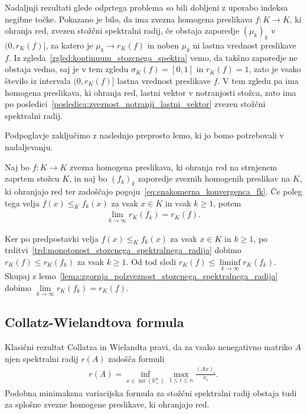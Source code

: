 \documentclass[mat2, tisk]{fmfdelo}
\begin{document}
Nadaljnji rezultati glede odprtega problema so bili dobljeni z uporabo
indeksa negibne točke. Pokazano je bilo, da ima zvezna homogena
preslikava $f\colon K\longrightarrow K$, ki ohranja red, zvezen
stožčni spektralni radij, če obstaja zaporedje $(\mu_k)_k$ v
$(0,r_K(f)]$, za katero je $\mu_k\longrightarrow r_K(f)$ in noben
$\mu_k$ ni lastna vrednost preslikave $f$. Iz zgleda~\ref{zgled:kontinuum_stozcnega_spektra} vemo, da
takšno zaporedje ne obstaja vedno, saj je v tem zgledu $\sigma_K(f)=[0,1]$ in $r_K(f) = 1$, 
zato je vsako število iz intervala $(0,r_K(f)]$ lastna vrednost preslikave $f$. V tem zgledu pa ima homogena
preslikava, ki ohranja red, lastni vektor v notranjosti stožca, zato
ima po posledici~\ref{posledica:zveznost_notranji_lastni_vektor}
zvezen stožčni spektralni radij.

Podpoglavje zaključimo z naslednjo preprosto lemo, ki jo bomo
potrebovali v nadaljevanju.

\begin{lema}\label{lema:zveznost_stozcnega_spektralnega_radija_dominacija}
  Naj bo $f\colon K\longrightarrow K$ zvezna homogena preslikava, ki
  ohranja red na strnjenem zaprtem stožcu $K$, in naj bo $(f_k)_k$
  zaporedje zveznih homogenih preslikav na $K$, ki ohranjajo red ter
  zadoščajo pogoju~\eqref{eq:enakomerna_konvergenca_fk}. Če poleg tega
  velja $f(x)\leq_K f_k(x)$ za vsak $x\in K$ in vsak $k\geq1$, potem
  \begin{align*}
  \lim\limits_{k\to\infty}r_K(f_k)=r_K(f).
  \end{align*}
\end{lema}


\begin{dokaz}
  Ker po predpostavki velja $f(x)\leq_K f_k(x)$ za vsak
  $x\in K$ in $k\geq1$, po
  trditvi~\ref{trd:monotonost_stozcnega_spektralnega_radija}
  dobimo $r_K(f)\leq r_K(f_k)$ za vsak $k\geq1$.
  Od tod sledi
  $r_K(f)\leq\liminf\limits_{k\to\infty}r_K(f_k)$.
  Skupaj z lemo~\ref{lema:zgornja_polzveznost_stozcnega_spektralnega_radija}
  dobimo
  $\lim\limits_{k\to\infty}r_K(f_k)=r_K(f)$.
\end{dokaz}








\subsection{Collatz-Wielandtova formula}

Klasični rezultat Collatza in Wielandta pravi, da za vsako nenegativno
matriko $A$ njen spektralni radij $r(A)$ zadošča formuli
\begin{align}
r(A)
=
\inf_{x\in\operatorname{int}(\mathbb{R}_+^n)}
\max_{1\leq i\leq n}
\frac{(Ax)_i}{x_i}.
\label{eq:collatz-wielandt-matrike}
\end{align}
Podobna minimaksna variacijska formula za stožčni spektralni radij
obstaja tudi za splošne zvezne homogene preslikave, ki ohranjajo red.
\end{document}

